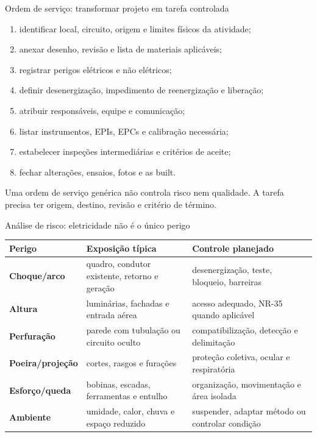 \begin{frame}{Ordem de serviço: transformar projeto em tarefa controlada}
\small
\begin{enumerate}
\item identificar local, circuito, origem e limites físicos da atividade;
\item anexar desenho, revisão e lista de materiais aplicáveis;
\item registrar perigos elétricos e não elétricos;
\item definir desenergização, impedimento de reenergização e liberação;
\item atribuir responsáveis, equipe e comunicação;
\item listar instrumentos, EPIs, EPCs e calibração necessária;
\item estabelecer inspeções intermediárias e critérios de aceite;
\item fechar alterações, ensaios, fotos e as built.
\end{enumerate}
\begin{caixaObs}
Uma ordem de serviço genérica não controla risco nem qualidade. A tarefa precisa ter origem, destino, revisão e critério de término.
\end{caixaObs}
\end{frame}

\begin{frame}{Análise de risco: eletricidade não é o único perigo}
\small
\begin{tabularx}{\textwidth}{>{\bfseries}p{2.9cm}X X}
\toprule
Perigo & Exposição típica & Controle planejado \\
\midrule
Choque/arco & quadro, condutor existente, retorno e geração & desenergização, teste, bloqueio, barreiras \\
Altura & luminárias, fachadas e entrada aérea & acesso adequado, NR-35 quando aplicável \\
Perfuração & parede com tubulação ou circuito oculto & compatibilização, detecção e delimitação \\
Poeira/projeção & cortes, rasgos e furações & proteção coletiva, ocular e respiratória \\
Esforço/queda & bobinas, escadas, ferramentas e entulho & organização, movimentação e área isolada \\
Ambiente & umidade, calor, chuva e espaço reduzido & suspender, adaptar método ou controlar condição \\
\bottomrule
\end{tabularx}
\end{frame}

